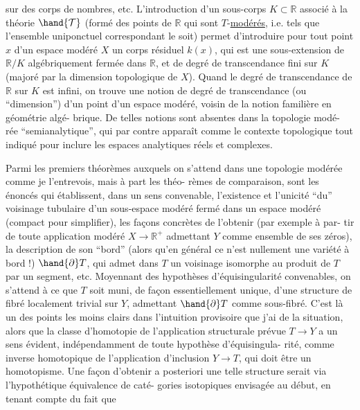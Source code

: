 
sur des corps de nombres, etc. L'introduction d'un sous-corps
$K \subset \mathbb{R}$ associé à la théorie $\hand{\mathcal{T}}$ (formé des points de $\mathbb{R}$ qui sont
$T$-\uline{modérés}, i.e. tels que l'ensemble uniponctuel correspondant le
soit) permet d'introduire pour tout point $x$ d'un espace modéré
$X$ un corps résiduel $k(x)$, qui est une sous-extension de $\mathbb{R}/K$
algébriquement fermée dans $\mathbb{R}$, et de degré de transcendance fini
sur $K$ (majoré par la dimension topologique de $X$). Quand le
degré de transcendance de $\mathbb{R}$ sur $K$ est infini, on trouve une
notion de degré de transcendance (ou ``dimension'') d'un point d'un
espace modéré, voisin de la notion familière en géométrie algé-%
brique. De telles notions sont absentes dans la topologie modé-%
rée ``semianalytique'', qui par contre apparaît comme le contexte
topologique tout indiqué pour inclure les espaces analytiques réels
et complexes.

Parmi les premiers théorèmes auxquels on s'attend dans
une topologie modérée comme je l'entrevois, mais à part les théo-%
rèmes de comparaison, sont les énoncés qui établissent, dans un
sens convenable, l'existence et l'unicité ``du'' voisinage tubulaire
d'un sous-espace modéré fermé dans un espace modéré (compact pour
simplifier), les façons concrètes de l'obtenir (par exemple à par-%
tir de toute application modéré $X \longrightarrow \mathbb{R}^{+}$ admettant $Y$ comme
ensemble de ses zéros), la description de son ``bord'' (alors qu'en
général ce n'est nullement une variété à bord !) $\hand{\partial}T$, qui admet
dans $T$ un voisinage isomorphe au produit de $T$ par un segment,
etc. Moyennant des hypothèses d'équisingularité convenables, on
s'attend à ce que $T$ soit muni, de façon essentiellement unique,
d'une structure de fibré localement trivial sur $Y$, admettant $\hand{\partial}T$
comme sous-fibré. C'est là un des points les moins clairs dans
l'intuition provisoire que j'ai de la situation, alors que la
classe d'homotopie de l'application structurale prévue $T \longrightarrow Y$
a un sens évident, indépendamment de toute hypothèse d'équisingula-%
rité, comme inverse homotopique de l'application d'inclusion $Y \longrightarrow T$,
qui doit être un homotopisme. Une façon d'obtenir a posteriori
une telle structure serait via l'hypothétique équivalence de caté-%
gories isotopiques envisagée au début, en tenant compte du fait que

